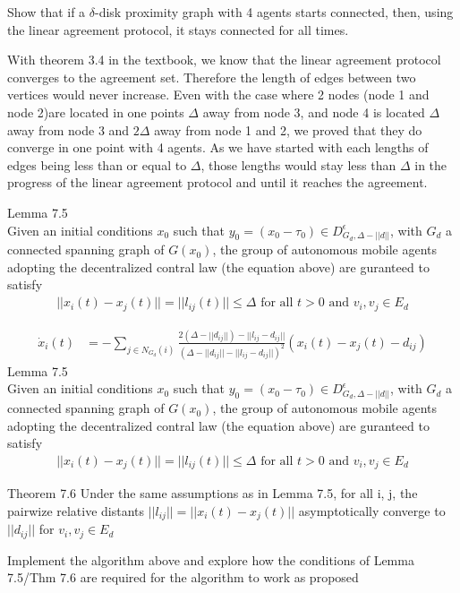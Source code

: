 \documentclass{article}
\begin{document}
\newpage
\begin{problem}
Show that if a $\delta$-disk proximity graph with 4 agents starts connected, then, using the linear agreement protocol, it stays connected for all times.

With theorem 3.4  in the textbook, we know that the linear agreement protocol converges to the agreement set. Therefore the length of edges between two vertices would never increase. Even with the case where 2 nodes (node 1 and node 2)are located in one points $\Delta$ away from node 3, and node 4 is located $\Delta$ away from node 3 and $2 \Delta$ away from node 1 and 2, we proved that they do converge in one point with 4 agents. As we have started with each lengths of edges being less than or equal to $\Delta$, those lengths would stay less than $\Delta$ in the progress of the linear agreement protocol and until it reaches the agreement. 

Lemma 7.5\\
    Given an initial conditions $x_0$ such that $y_0 = (x_0 - \tau_0) \in D_{G_{d}, \Delta -||d||}^\epsilon$, with $G_d$ a connected spanning graph of $G(x_0)$, the group of autonomous mobile agents adopting the decentralized contral law (the equation above) are guranteed to satisfy
    \begin{align*}
        ||x_i(t) - x_j(t)|| = ||l_{ij}(t)|| \leq \Delta \text{ for all } t > 0 \text{ and }{ v_i, v_j} \in E_d
    \end{align*}
\end{problem}
\begin{problem}
    \begin{align*}
        \dot x_i(t) &= -\sum_{j \in N_{G_d}(i)} \frac{2(\Delta - ||d_{ij}||) - ||l_{ij} - d_{ij}||}{(\Delta - ||d_{ij}|| - ||l_{ij} - d_{ij}||)^2} (x_i(t) - x_j(t) - d_{ij} )
    \end{align*}
    Lemma 7.5\\
    Given an initial conditions $x_0$ such that $y_0 = (x_0 - \tau_0) \in D_{G_{d}, \Delta -||d||}^\epsilon$, with $G_d$ a connected spanning graph of $G(x_0)$, the group of autonomous mobile agents adopting the decentralized contral law (the equation above) are guranteed to satisfy
    \begin{align*}
        ||x_i(t) - x_j(t)|| = ||l_{ij}(t)|| \leq \Delta \text{ for all } t > 0 \text{ and }{ v_i, v_j} \in E_d
    \end{align*}

    Theorem 7.6
    Under the same assumptions as in Lemma 7.5, for all i, j, the pairwize relative distants $||l_{ij}|| = ||x_i(t) - x_j(t)||$ asymptotically converge to $||d_{ij}||$ for ${v_i, v_j} \in E_d$
    
    \vspace{12pt}
    Implement the algorithm above and explore how the conditions of Lemma 7.5/Thm 7.6 are required for the algorithm to work as proposed    
\end{problem}
    
\end{document}
